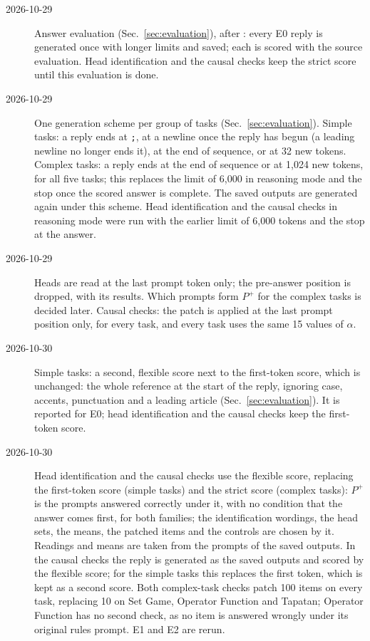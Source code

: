 \documentclass[11pt,a4paper]{article}
\begin{document}
\begin{description}
\item[2026-10-29] Answer evaluation (Sec.~\ref{sec:evaluation}), after \citet{hua2025flaw}: every E0 reply is generated once with longer limits and saved; each is scored with the source evaluation. Head identification and the causal checks keep the strict score until this evaluation is done.
\item[2026-10-29] One generation scheme per group of tasks (Sec.~\ref{sec:evaluation}). Simple tasks: a reply ends at \texttt{;}, at a newline once the reply has begun (a leading newline no longer ends it), at the end of sequence, or at 32 new tokens. Complex tasks: a reply ends at the end of sequence or at 1,024 new tokens, for all five tasks; this replaces the limit of 6,000 in reasoning mode and the stop once the scored answer is complete. The saved outputs are generated again under this scheme. Head identification and the causal checks in reasoning mode were run with the earlier limit of 6,000 tokens and the stop at the answer.
\item[2026-10-29] Heads are read at the last prompt token only; the pre-answer position is dropped, with its results. Which prompts form $P^{+}$ for the complex tasks is decided later. Causal checks: the patch is applied at the last prompt position only, for every task, and every task uses the same 15 values of $\alpha$.
\item[2026-10-30] Simple tasks: a second, flexible score next to the first-token score, which is unchanged: the whole reference at the start of the reply, ignoring case, accents, punctuation and a leading article (Sec.~\ref{sec:evaluation}). It is reported for E0; head identification and the causal checks keep the first-token score.
\item[2026-10-30] Head identification and the causal checks use the flexible score, replacing the first-token score (simple tasks) and the strict score (complex tasks): $P^{+}$ is the prompts answered correctly under it, with no condition that the answer comes first, for both families; the identification wordings, the head sets, the means, the patched items and the controls are chosen by it. Readings and means are taken from the prompts of the saved outputs. In the causal checks the reply is generated as the saved outputs and scored by the flexible score; for the simple tasks this replaces the first token, which is kept as a second score. Both complex-task checks patch 100 items on every task, replacing 10 on Set Game, Operator Function and Tapatan; Operator Function has no second check, as no item is answered wrongly under its original rules prompt. E1 and E2 are rerun.

\end{description}
\end{document}
